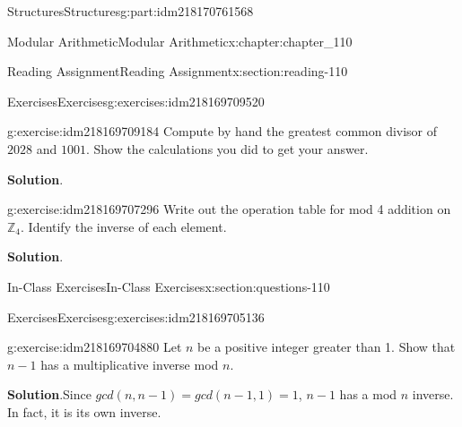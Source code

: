 \documentclass[oneside,10pt,]{book}
\newcommand{\blocktitlefont}{\relax}
\numberwithin{equation}{section}
\begin{document}
\begin{partptx}{Structures}{}{Structures}{}{}{g:part:idm218170761568}
\begin{chapterptx}{Modular Arithmetic}{}{Modular Arithmetic}{}{}{x:chapter:chapter_110}
\begin{sectionptx}{Reading Assignment}{}{Reading Assignment}{}{}{x:section:reading-110}
%
%
\typeout{************************************************}
\typeout{************************************************}
%
\begin{exercises-subsection-numberless}{Exercises}{}{Exercises}{}{}{g:exercises:idm218169709520}
\par\medskip\noindent%
%
\begin{exercisegroup}
\begin{divisionexerciseeg}{1}{}{}{g:exercise:idm218169709184}%
Compute by hand the greatest common divisor of \(2028\)  and \(1001\).  Show the calculations you did to get your answer.%
\par\smallskip%
\noindent\textbf{\blocktitlefont Solution}.\hypertarget{g:solution:idm218169707632}{}\quad{}%
\end{divisionexerciseeg}%
\begin{divisionexerciseeg}{2}{}{}{g:exercise:idm218169707296}%
Write out the operation table for mod 4 addition on \(\mathbb{Z}_4\).  Identify the inverse of each element.%
\par\smallskip%
\noindent\textbf{\blocktitlefont Solution}.\hypertarget{g:solution:idm218169706160}{}\quad{}%
\end{divisionexerciseeg}%
\end{exercisegroup}
\par\medskip\noindent
\end{exercises-subsection-numberless}
\end{sectionptx}
%
%
\typeout{************************************************}
\typeout{************************************************}
%
\begin{sectionptx}{In-Class Exercises}{}{In-Class Exercises}{}{}{x:section:questions-110}
%
%
%
\typeout{************************************************}
\typeout{************************************************}
%
\begin{exercises-subsection-numberless}{Exercises}{}{Exercises}{}{}{g:exercises:idm218169705136}
\par\medskip\noindent%
%
\begin{exercisegroup}
\begin{divisionexerciseeg}{1}{}{}{g:exercise:idm218169704880}%
Let \(n\) be a positive integer greater than 1.  Show that \(n-1\) has a multiplicative inverse mod \(n\).%
\par\smallskip%
\noindent\textbf{\blocktitlefont Solution}.\hypertarget{g:solution:idm218169702816}{}\quad{}Since \(gcd(n,n-1)=gcd(n-1,1)=1\), \(n-1\) has a mod \(n\) inverse.  In fact, it is its own inverse.%

\end{divisionexerciseeg}
\end{exercisegroup}
\end{exercises-subsection-numberless}
\end{sectionptx}
\end{chapterptx}
\end{partptx}
\end{document}

